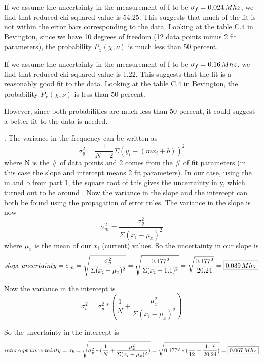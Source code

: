 \documentclass{article}
\begin{document}
 If we assume the uncertainty in the measurement of f to be $\sigma_f=0.024\hspace{0.5mm}Mhz$, we find that reduced chi-squared value is 54.25. This suggests that much of the fit is not within the error bars corresponding to the data. Looking at the table C.4 in Bevington, since we have 10 degrees of freedom (12 data points minus 2 fit parameters), the probability $P_{\chi}(\chi,\nu)$ is much less than 50 percent.
 
If we assume the uncertainty in the measurement of f to be $\sigma_f=0.16\hspace{0.5mm}Mhz$, we find that reduced chi-squared value is 1.22. This suggests that the fit is a reasonably good fit to the data. Looking at the table C.4 in Bevington, the probability $P_{\chi}(\chi,\nu)$ is less than 50 percent. 

However, since both probabilities are much less than 50 percent, it could suggest a better fit to the data is needed. \newline
 
  
. The variance in the frequency can be written as \[\sigma_{y}^2=\frac{1}{N-2}\Sigma{(y_i-(mx_i+b))^2}\] where N is the \# of data points and 2 comes from the \# of fit parameters (in this case the slope and intercept means 2 fit parameters). In our case, using the m and b from part 1, the square root of this gives the uncertainty in y, which turned out to be around .
Now the variance in the slope and the intercept can both be found using the propagation of error rules.
The variance in the slope is now \[\sigma_{m}^2=\frac{\sigma_{y}^2}{\Sigma (x_i-\mu_x)^2}\] where $\mu_x$ is the mean of our $x_i$ (current) values. So the uncertainty in our slope is \[slope\hspace{1mm}uncertainty=\sigma_{m}=\sqrt{\frac{\sigma_{y}^2}{\Sigma (x_i-\mu_x)^2}}=\sqrt{\frac{0.177^2}{\Sigma (x_i-1.1)^2}}=\sqrt{\frac{0.177^2}{20.24}}=\boxed{0.039\hspace{0.5mm}Mhz}\]

Now the variance in the intercept is \[\sigma_{b}^2=\sigma_{y}^2*(\frac{1}{N}+\frac{\mu_{x}^2}{\Sigma (x_i-\mu_x)^2})\] 

So the uncertainty in the intercept is \[intercept\hspace{1mm}uncertainty=\sigma_{b}=\sqrt{\sigma_{y}^2*(\frac{1}{N}+\frac{\mu_{x}^2}{\Sigma (x_i-\mu_x)^2})}=\sqrt{0.177^2*(\frac{1}{12}+\frac{1.1^2}{20.24})}=\boxed{0.067\hspace{0.5mm}Mhz}\] 
\end{document}
